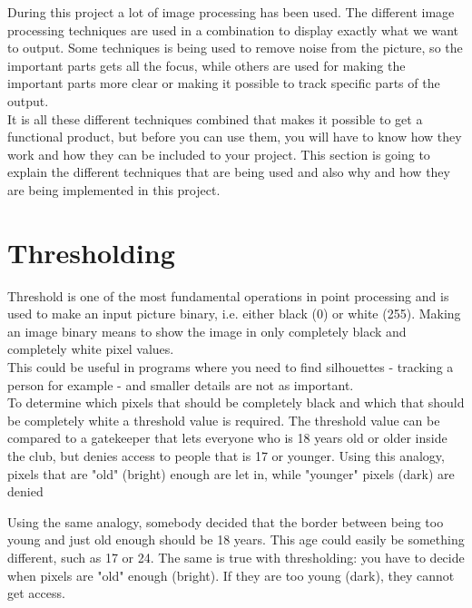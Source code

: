 During this project a lot of image processing has been used. The different image processing techniques are used in a combination to display exactly what we want to output. Some techniques is being used to remove noise from the picture, so the important parts gets all the focus, while others are used for making the important parts more clear or making it possible to track specific parts of the output. \\
It is all these different techniques combined that makes it possible to get a functional product, but before you can use them, you will have to know how they work and how they can be included to your project. This section is going to explain the different techniques that are being used and also why and how they are being implemented in this project.

\section{Thresholding}
Threshold is one of the most fundamental operations in point processing  and is used to make an input picture binary, i.e. either black (0) or white (255). Making an image binary means to show the image in only completely black and completely white pixel values. \\
This could be useful in programs where you need to find silhouettes - tracking a person for example - and smaller details are not as important. \\
To determine which pixels that should be completely black and which that should be completely white a threshold value is required. The threshold value can be compared to a gatekeeper that lets everyone who is 18 years old or older inside the club, but denies access to people that is 17 or younger. Using this analogy, pixels that are "old" (bright) enough are let in, while "younger" pixels (dark) are denied

Using the same analogy, somebody decided that the border between being too young and just old enough should be 18 years. This age could easily be something different, such as 17 or 24. The same is true with thresholding: you have to decide when pixels are "old" enough (bright). If they are too young (dark), they cannot get access.

